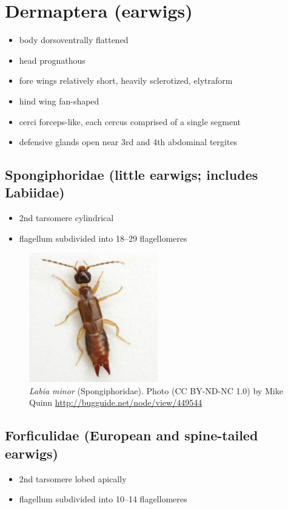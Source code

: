 \documentclass[letterpaper, 11pt]{article}
\begin{document}
\section{Dermaptera (earwigs)}
\begin{itemize}
\item body dorsoventrally flattened
\item head prognathous
\item fore wings relatively short, heavily sclerotized, elytraform
\item hind wing fan-shaped
\item cerci forceps-like, each cercus comprised of a single segment
\item defensive glands open near 3rd and 4th abdominal tergites
\end{itemize}

\subsection*{Spongiphoridae (little earwigs; includes Labiidae)}
\begin{itemize}
\item 2nd tarsomere cylindrical
\item flagellum subdivided into 18--29 flagellomeres
\end{itemize}

\begin{figure}[ht!]
  \centering
    \includegraphics[width=0.5\textwidth]{spongi}
  \caption{\textit{Labia minor} (Spongiphoridae). Photo (CC BY-ND-NC 1.0) by Mike Quinn \url{http://bugguide.net/node/view/449544}}
  \label{fig:spongi}
\end{figure}

\subsection*{Forficulidae (European and spine-tailed earwigs)}
\begin{itemize}
\item 2nd tarsomere lobed apically
\item flagellum subdivided into 10--14 flagellomeres
\end{itemize}
\end{document}
